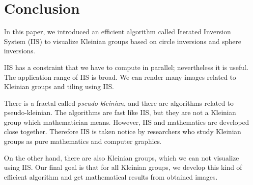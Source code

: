
\section{Conclusion}

In this paper, we introduced an efficient algorithm
called Iterated Inversion System (IIS) to visualize Kleinian
groups based on circle inversions and sphere inversions.

IIS has a constraint that we have to compute in parallel;
nevertheless it is useful. The application range of IIS is broad.
We can render many images related to Kleinian groups and tiling using
IIS.

There is a fractal called \textit{pseudo-kleinian}, and
there are algorithms related to pseudo-kleinian.
The algorithms are fast like IIS, but they are not a Kleinian group which
mathematician means.
However, IIS and mathematics are developed close
together.
Therefore IIS is taken notice by researchers who study Kleinian groups as
pure mathematics and computer graphics.

On the other hand, there are also Kleinian groups, which we can not
visualize using IIS.
Our final goal is that for all Kleinian groups, we develop this kind of
efficient algorithm and get mathematical results from obtained images.
